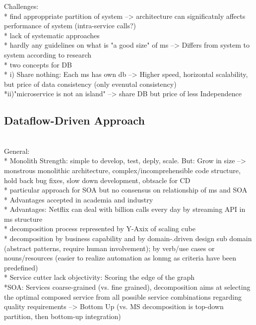 Challenges: \\
* find approppriate partition of system --> architecture can significatnly affects performance of system (intra-service calls?) \\
* lack of systematic approaches \\
* hardly any guidelines on what is "a good size" of ms --> Differs from system to system according to research\\
* two concepts for DB\\
* i) Share nothing: Each ms has own db --> Higher speed, horizontal scalability, but price of data consistency (only evenutal consistency)\\
*ii)"microservice is not an island" --> share DB but price of less Independence\\


\subsection{Dataflow-Driven Approach}
\cite{DataflowDrivenChen} \\

General: \\
* Monolith Strength: simple to develop, test, deply, scale. But: Grow in size --> monstrous monolithic architecture, complex/incomprehensible code structure, hold back bug fixes, slow down development, obtsacle for CD\\
* particular approach for SOA but no consensus on relationship of ms and SOA \\
* Advantages  accepted in academia and industry\\
* Advantages: Netflix can deal with billion calls every day by streaming API in ms structure\\
* decomposition process represented by Y-Axix of scaling cube\\
* decomposition by business capability and by domain-.driven design sub domain (abstract patterns, require human involvement); by verb/use cases or nouns/resources (easier to realize automation as lonmg as criteria have been predefined)\\
* Service cutter lack objectivity: Scoring the edge of the graph\\
*SOA: Services coarse-grained (vs. fine grained), decomposition aims at selecting the optimal composed service from all possible service combinations regarding quality requirements --> Bottom Up (vs. MS decomposition is top-down partition, then bottom-up integration)\\

